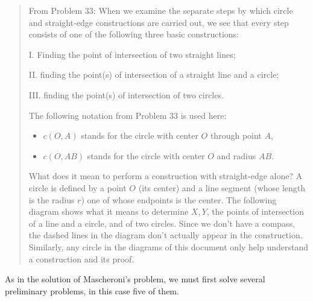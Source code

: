 \documentclass[11pt,a4paper]{article}
\begin{document}
\begin{quote}
From Problem 33: When we examine the separate steps by which circle and straight-edge constructions are carried out, we see that every step consists of one of the following three basic constructions:

I. Finding the point of intersection of two straight lines;

II. finding the point(s) of intersection of a straight line and a circle;

III. finding the point(s) of intersection of two circles.

The following notation from Problem 33 is used here:
\begin{itemize}
\item $c(O,A)$ stands for the circle with center $O$ through point $A$,
\item $c(O,AB)$ stands for the circle with center $O$ and radius $AB$.
\end{itemize}
What does it mean to perform a construction with straight-edge alone? A circle is defined by a point $O$ (its center) and a line segment (whose length is the radius $r$) one of whose endpoints is the center. The following diagram shows what it means to determine $X,Y$, the points of intersection of a line and a circle, and of two circles. Since we don't have a compass, the dashed lines in the diagram don't actually appear in the construction. Similarly, any circle in the diagrams of this document only help understand a construction and its proof.
\begin{center}
\end{center}
\end{quote}
As in the solution of Mascheroni's problem, we must first solve several preliminary problems, in this case five of them. 
\end{document}
